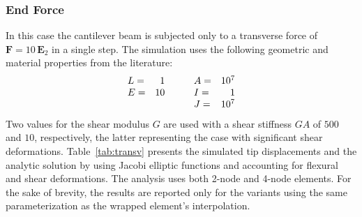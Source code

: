 \subsubsection{End Force }\label{sec:frame-1002}
In this case the cantilever beam is subjected only to a transverse force of \(\bm{F} = 10 \, \mathbf{E}_2\) in a single step. 
The simulation uses the following geometric and material properties from the literature:
\[
\begin{array}{lr}
L  =&    1 \\
E  =&   10 \\
\hphantom{.}
\end{array}
\qquad 
\begin{array}{lr}
A  =&   10^7 \\
I  =&    1   \\
J  =&   10^7 \\
\end{array}
\]
Two values for the shear modulus \(G\) are used with a shear stiffness \(GA\) of \(500\) and \(10\), respectively, the latter representing the case with significant shear deformations. 
Table~\ref{tab:transv} presents the simulated tip displacements and the analytic solution by \cite{batista2016closedform} using Jacobi elliptic functions and accounting for flexural and shear deformations.
%
The analysis uses both 2-node and 4-node elements.
For the sake of brevity, the results are reported only for the variants using
the same parameterization as the wrapped element's interpolation.
%
\begin{center}
\begin{table}[H]
\caption{Tip displacements for transversely loaded plane cantilever.}
\label{tab:transv}

\end{table}
\end{center}

